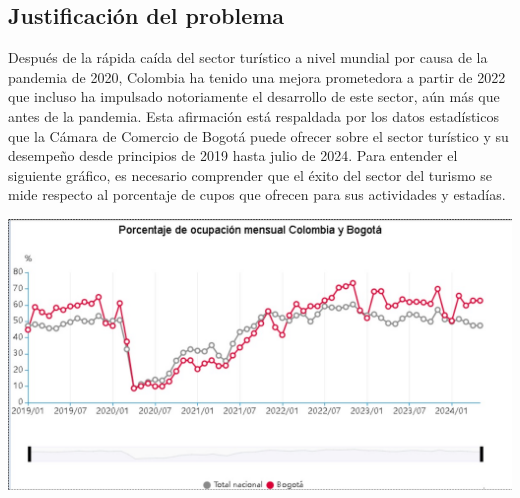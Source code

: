 \subsection{Justificación del problema}
Después de la rápida caída del sector turístico a nivel mundial por causa de la pandemia de 2020, Colombia ha tenido una mejora prometedora a partir de 2022 que incluso ha impulsado notoriamente el desarrollo de este sector, aún más que antes de la pandemia. Esta afirmación está respaldada por los datos estadísticos que la Cámara de Comercio de Bogotá puede ofrecer sobre el sector turístico y su desempeño desde principios de 2019 hasta julio de 2024. Para entender el siguiente gráfico, es necesario comprender que el éxito del sector del turismo se mide respecto al porcentaje de cupos que ofrecen para sus actividades y estadías.

\begin{adjustbox}{
    center,
    caption=[{Porcentaje de ocupación mensual: Total nacional y Bogotá}]{\centering Ocupación mensual Bogotá. Fuente: (DANE, Encuesta mensual de alojamiento EMA (enero 2019 - abril 2024))},
    label={ocupacionmensualbogota},
    nofloat=figure}

    \includegraphics[width=1\textwidth]{Content/Images/graficaTurismoBogota.jpeg}

\end{adjustbox}

